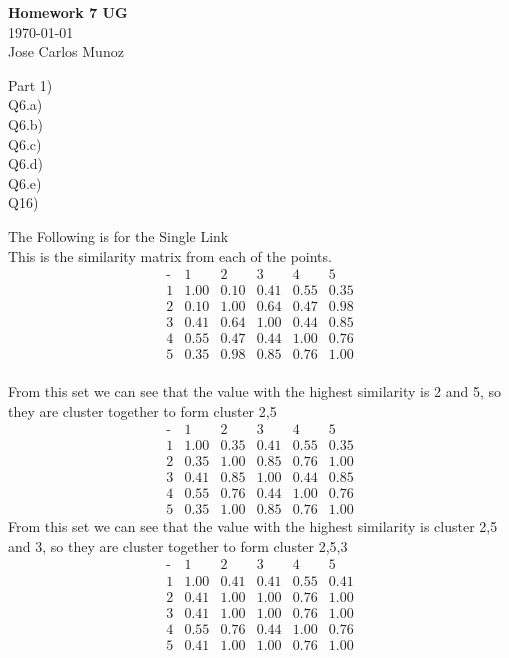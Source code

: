 \documentclass[12pt,english]{article}
\begin{document}
\begin{center}
    \Large
    \textbf{Homework 7 UG}\\
    \small
    \today\\
    \large
    Jose Carlos Munoz
\end{center}%
Part 1)\\
Q6.a)\\
Q6.b)\\
Q6.c)\\
Q6.d)\\
Q6.e)\\
Q16)\par
The Following is for the Single Link\\
This is the similarity matrix from each of the points.
\begin{equation*}
\begin{array}{c|ccccc}
\mbox{-}& 1 & 2 & 3 & 4 & 5\\
\hline
1 & 1.00 & 0.10 & 0.41 & 0.55 & 0.35 \\
2 & 0.10 & 1.00 & 0.64 & 0.47 & 0.98 \\
3 & 0.41 & 0.64 & 1.00 & 0.44 & 0.85 \\
4 & 0.55 & 0.47 & 0.44 & 1.00 & 0.76 \\
5 & 0.35 & 0.98 & 0.85 & 0.76 & 1.00 
\end{array}
\end{equation*}\\
From this set we can see that the value with the highest similarity is 2 and 5, so they are cluster together to form cluster 2,5\\
\begin{equation*}
\begin{array}{c|ccccc}
\mbox{-}& 1 & 2 & 3 & 4 & 5\\
\hline
1 & 1.00 & 0.35 & 0.41 & 0.55 & 0.35 \\
2 & 0.35 & 1.00 & 0.85 & 0.76 & 1.00 \\
3 & 0.41 & 0.85 & 1.00 & 0.44 & 0.85 \\
4 & 0.55 & 0.76 & 0.44 & 1.00 & 0.76 \\
5 & 0.35 & 1.00 & 0.85 & 0.76 & 1.00 
\end{array}
\end{equation*}
From this set we can see that the value with the highest similarity is cluster 2,5 and 3, so they are cluster together to form cluster 2,5,3\\
\begin{equation*}
\begin{array}{c|ccccc}
\mbox{-}& 1 & 2 & 3 & 4 & 5\\
\hline
1 & 1.00 & 0.41 & 0.41 & 0.55 & 0.41 \\
2 & 0.41 & 1.00 & 1.00 & 0.76 & 1.00 \\
3 & 0.41 & 1.00 & 1.00 & 0.76 & 1.00 \\
4 & 0.55 & 0.76 & 0.44 & 1.00 & 0.76 \\
5 & 0.41 & 1.00 & 1.00 & 0.76 & 1.00 
\end{array}
\end{equation*}
\end{document}
